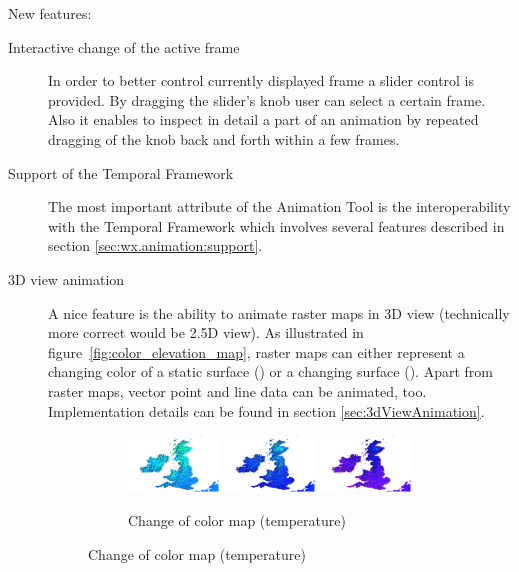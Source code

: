 \documentclass[a4paper,12pt,oneside]{book}
\newcommand{\tf}{Temporal Framework\xspace}
\newcommand{\at}{Animation Tool\xspace}
\begin{document}
\noindent New features:
\begin{description}
    \item[Interactive change of the active frame]
    In order to better control currently displayed frame a slider control is provided.
    By dragging the slider's knob user can select a certain frame.
    Also it enables to inspect in detail a part of an animation
    by repeated dragging of the knob back and forth within a few frames.

    \item[Support of the \tf]
    The most important attribute of the \at is the interoperability with the \tf
    which involves several features described in section \ref{sec:wx.animation:support}.

    \item[3D view animation]
    A nice feature is the ability to animate raster maps in 3D view (technically more correct would be 2.5D view).
    As illustrated in figure~\ref{fig:color_elevation_map},
    raster maps can either represent a changing color of a static surface () or
    a changing surface ().
    Apart from raster maps, vector point and line data can be animated, too.
    Implementation details can be found in section \ref{sec:3dViewAnimation}.

    \begin{figure}[ht]
    \centering
        \begin{subfigure}[h]{\textwidth}
        \centering
        \includegraphics[width=0.3\textwidth]{./images/color_map1.png}
        \includegraphics[width=0.3\textwidth]{./images/color_map2.png}
        \includegraphics[width=0.3\textwidth]{./images/color_map3.png}
        \caption{Change of color map (temperature)}
        \label{fig:color_map}
        \end{subfigure}


\end{figure}
\end{description}
\end{document}
